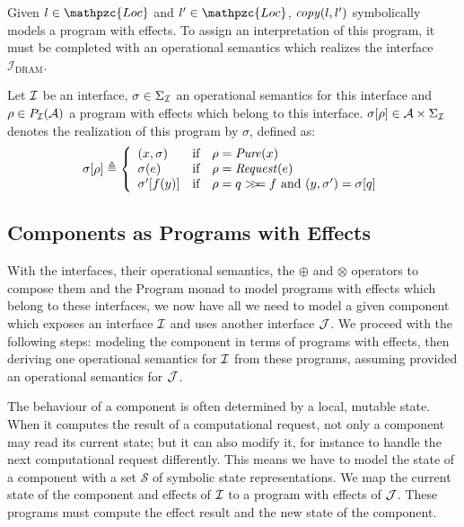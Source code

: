 Given $l \in \mathpzc{Loc}$ and $l' \in \mathpzc{Loc}$, $\mathit{copy}(l, l')$
symbolically models a program with effects.
%
To assign an interpretation of this program, it must be completed with an
operational semantics which realizes the interface
$\mathcal{I}_{\mathrm{DRAM}}$.

\begin{definition} \label{def:freespec:realisation} Let $\mathcal{I}$ be an interface,
  $\sigma \in \Sigma_{\mathcal{I}}$ an operational semantics for this interface and
  $\rho \in P_{\mathcal{I}}(\mathcal{A})$ a program with effects which belong to this
  interface.
  $\sigma[\rho] \in \mathcal{A} \times \Sigma_{\mathcal{I}}$ denotes the realization of
  this program by $\sigma$, defined as:
  \[ \sigma[\rho] \triangleq \left\{
      \begin{array}{lcl} (x, \sigma) & \text{if} & \rho =
                                                   \mathit{Pure}(x) \\
        \sigma(e) & \text{if} & \rho =
                                \mathit{Request}(e) \\
        \sigma'[f(y)] & \text{if} & \rho =
                                    q >\!\!>\!\!= f\text{ and }(y, \sigma') = \sigma[q] \\
      \end{array}
    \right.
  \]
\end{definition}

\subsection{Components as Programs with Effects}

With the interfaces, their operational semantics, the $\oplus$ and $\otimes$
operators to compose them and the Program monad to model programs with effects
which belong to these interfaces, we now have all we need to model a given
component which exposes an interface $\mathcal{I}$ and uses another interface $\mathcal{J}$.
%
We proceed with the following steps: modeling the component in terms of programs
with effects, then deriving one operational semantics for $\mathcal{I}$ from these
programs, assuming provided an operational semantics for $\mathcal{J}$.

The behaviour of a component is often determined by a local, mutable state.
%
When it computes the result of a computational request, not only a component may
read its current state; but it can also modify it, for instance to handle the
next computational request differently.
%
This means we have to model the state of a component with a set $\mathcal{S}$ of
symbolic state representations.
%
We map the current state of the component and effects of $\mathcal{I}$ to a program with
effects of $\mathcal{J}$.
%
These programs must compute the effect result and the new state of the
component.

